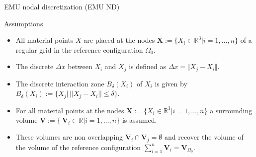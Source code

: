 \documentclass[12pt,t]{beamer}
\newcommand{\dx}{{\Delta x}}
\begin{document}
\begin{frame}{EMU nodal discretization (EMU ND)}

\begin{block}{Assumptions}
\begin{itemize}
\item All material points $X$ are placed at the nodes $\mathbf{X}:=\lbrace X_i \in \mathbb{R}^3\vert i=1,\ldots,n\rbrace$ of a regular grid in the reference configuration $\Omega_0$.
\item The discrete  $\dx$ between $X_i$ and $X_j$ is defined as $\dx = \Vert X_j - X_i \Vert$.
\item  The discrete interaction zone $B_\delta(X_i)$ of $X_i$ is given by $B_\delta(X_i):=\lbrace X_j \vert \,\vert\vert X_j-X_i\vert\vert \leq \delta\rbrace$.
\item For all material points at the nodes $\mathbf{X}:=\lbrace X_i \in \mathbb{R}^3\vert i=1,\ldots,n\rbrace$ a surrounding volume $\mathbf{V}:=\lbrace\ \mathbf{V}_i \in \mathbb{R}\vert i=1,\ldots,n\rbrace$ is assumed.
\item These volumes are non overlapping $\mathbf{V}_i \cap \mathbf{V}_j = \emptyset$ and recover the volume of the volume of the reference configuration $\sum_{i=1}^n \mathbf{V}_i = \mathbf{V}_{\Omega_0}$.
\end{itemize}
\end{block}
\end{frame}
\end{document}
